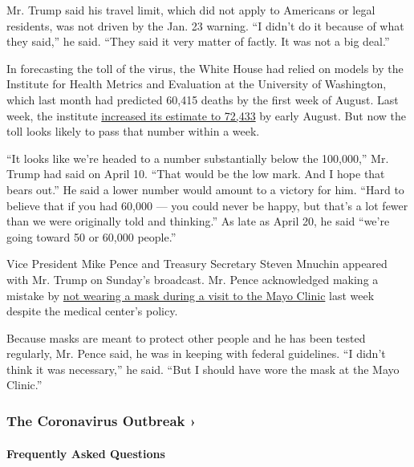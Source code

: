 Mr. Trump said his travel limit, which did not apply to Americans or
legal residents, was not driven by the Jan. 23 warning. ``I didn't do it
because of what they said,'' he said. ``They said it very matter of
factly. It was not a big deal.''

In forecasting the toll of the virus, the White House had relied on
models by the Institute for Health Metrics and Evaluation at the
University of Washington, which last month had predicted 60,415 deaths
by the first week of August. Last week, the institute
\href{https://covid19.healthdata.org/united-states-of-america}{increased
its estimate to 72,433} by early August. But now the toll looks likely
to pass that number within a week.

``It looks like we're headed to a number substantially below the
100,000,'' Mr. Trump had said on April 10. ``That would be the low mark.
And I hope that bears out.'' He said a lower number would amount to a
victory for him. ``Hard to believe that if you had 60,000 --- you could
never be happy, but that's a lot fewer than we were originally told and
thinking.'' As late as April 20, he said ``we're going toward 50 or
60,000 people.''

Vice President Mike Pence and Treasury Secretary Steven Mnuchin appeared
with Mr. Trump on Sunday's broadcast. Mr. Pence acknowledged making a
mistake by
\href{https://www.nytimes3xbfgragh.onion/2020/04/28/us/politics/coronavirus-pence-mask.html}{not
wearing a mask during a visit to the Mayo Clinic} last week despite the
medical center's policy.

Because masks are meant to protect other people and he has been tested
regularly, Mr. Pence said, he was in keeping with federal guidelines.
``I didn't think it was necessary,'' he said. ``But I should have wore
the mask at the Mayo Clinic.''

\href{https://www.nytimes3xbfgragh.onion/news-event/coronavirus?action=click\&pgtype=Article\&state=default\&region=MAIN_CONTENT_3\&context=storylines_faq}{}

\hypertarget{the-coronavirus-outbreak-}{%
\subsubsection{The Coronavirus Outbreak
›}\label{the-coronavirus-outbreak-}}

\hypertarget{frequently-asked-questions}{%
\paragraph{Frequently Asked
Questions}\label{frequently-asked-questions}}

